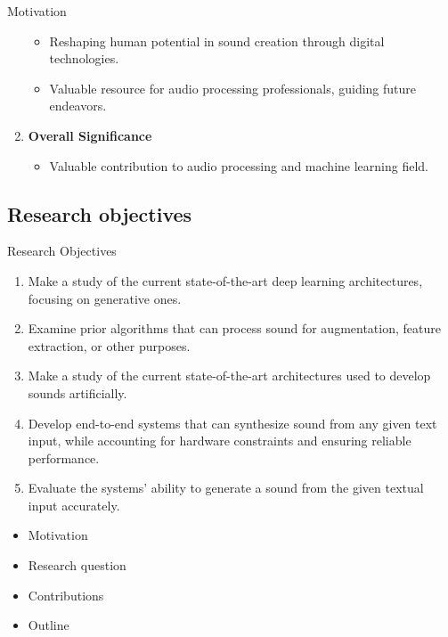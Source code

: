 \begin{frame}{Motivation}
\begin{enumerate}
\begin{itemize}
                  \item Reshaping human potential in sound creation through digital technologies.
                  \item Valuable resource for audio processing professionals, guiding future endeavors.
              \end{itemize}
        \item \textbf{Overall Significance}
              \begin{itemize}
                  \item Valuable contribution to audio processing and machine learning field.
              \end{itemize}
    \end{enumerate}
\end{frame}

\subsection{Research objectives}

\begin{frame}{Research Objectives}
    \begin{enumerate}
        \item Make a study of the current state-of-the-art deep learning architectures, focusing on generative ones.
        \item Examine prior algorithms that can process sound for augmentation, feature extraction, or other purposes.
        \item Make a study of the current state-of-the-art architectures used to develop sounds artificially.
        \item Develop end-to-end systems that can synthesize sound from any given text input, while accounting for hardware constraints and ensuring reliable performance.
        \item Evaluate the systems’ ability to generate a sound from the given textual input accurately.
    \end{enumerate}
\end{frame}

\begin{frame}
    \begin{itemize}
        \item Motivation
        \item Research question
        \item Contributions
        \item Outline
    \end{itemize}
\end{frame}